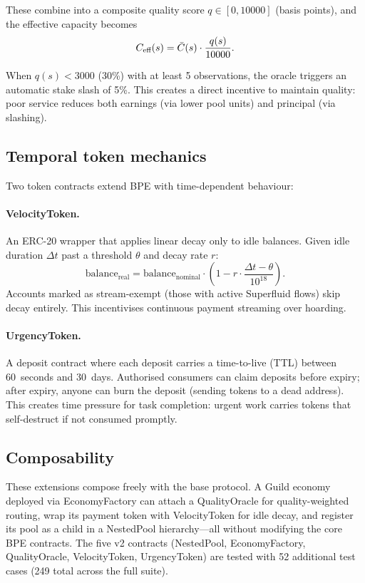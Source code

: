 These combine into a composite quality score $q \in [0, 10000]$ (basis points),
and the effective capacity becomes
\[
  C_{\text{eff}}(s) = \bar{C}(s) \cdot \frac{q(s)}{10000}.
\]

When $q(s) < 3000$ (30\%) with at least 5 observations, the oracle triggers an
automatic stake slash of 5\%. This creates a direct incentive to maintain quality:
poor service reduces both earnings (via lower pool units) and principal (via slashing).

\subsection{Temporal token mechanics}

Two token contracts extend BPE with time-dependent behaviour:

\paragraph{VelocityToken.}
An ERC-20 wrapper that applies linear decay only to idle balances.
Given idle duration $\Delta t$ past a threshold $\theta$ and decay rate $r$:
\[
  \text{balance}_{\text{real}} = \text{balance}_{\text{nominal}} \cdot \left(1 - r \cdot \frac{\Delta t - \theta}{10^{18}}\right).
\]
Accounts marked as stream-exempt (those with active Superfluid flows) skip decay
entirely. This incentivises continuous payment streaming over hoarding.

\paragraph{UrgencyToken.}
A deposit contract where each deposit carries a time-to-live (TTL) between
60~seconds and 30~days. Authorised consumers can claim deposits before expiry;
after expiry, anyone can burn the deposit (sending tokens to a dead address).
This creates time pressure for task completion: urgent work carries tokens that
self-destruct if not consumed promptly.

\subsection{Composability}

These extensions compose freely with the base protocol. A Guild economy
deployed via EconomyFactory can attach a QualityOracle for quality-weighted routing,
wrap its payment token with VelocityToken for idle decay, and register its pool as
a child in a NestedPool hierarchy---all without modifying the core BPE contracts.
The five v2 contracts (NestedPool, EconomyFactory, QualityOracle, VelocityToken,
UrgencyToken) are tested with 52 additional test cases (249 total across the full suite).
